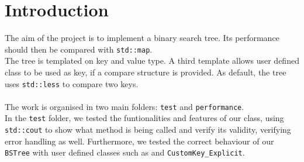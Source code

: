 \documentclass[12pt,a4paper,openany]{scrartcl}
\begin{document}
	
	\maketitle
	
	
	\section{Introduction}
	The aim of the project is to implement a binary search tree. Its performance should then be compared with \texttt{std::map}.\\
	The tree is templated on key and value type. A third template allows user defined class to be used as key, if a compare structure is provided. As default, the tree uses \texttt{std::less} to compare two keys.\\\\
	The work is organised in two main folders: \texttt{test} and \texttt{performance}.\\
	In the \texttt{test} folder, we tested the funtionalities and features of our class, using \texttt{std::cout} to show what method is being called and verify its validity, verifying error handling as well. Furthermore, we tested the correct behaviour of our \texttt{BSTree} with user defined classes such as  and \texttt{CustomKey\_Explicit}.
	
\end{document}
